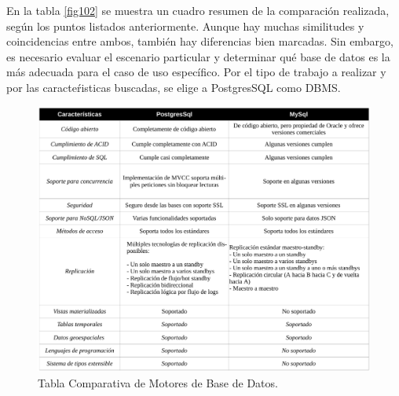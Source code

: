 \documentclass[11pt,oneside]{book}
\begin{document}
En la tabla \eqref{fig102} se muestra un cuadro resumen de la comparación realizada, según los puntos listados anteriormente. Aunque hay muchas similitudes y coincidencias entre ambos, también hay diferencias bien marcadas. Sin embargo, es necesario evaluar el escenario particular y determinar qué base de datos es la más adecuada para el caso de uso específico. Por el tipo de trabajo a realizar y por las caracteŕisticas buscadas, se elige a PostgresSQL como DBMS.

\renewcommand{\figurename}{Tabla.} 
\begin{figure}[tbhp]
\centerline{\includegraphics[scale=0.8]{figs/Tabla_Comparativa_DB.pdf}}
\caption{Tabla Comparativa de Motores de Base de Datos.}
\label{fig102}
\end{figure}
\renewcommand{\figurename}{Figura.}

\newpage
\end{document}
